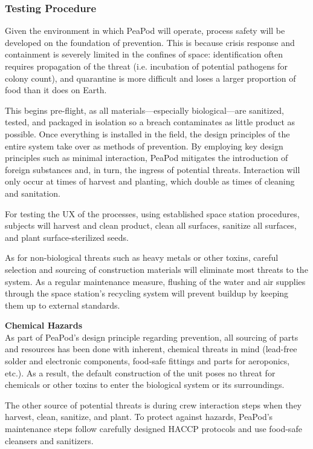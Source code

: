\subsubsection{Testing Procedure}

Given the environment in which PeaPod will operate, process safety will be developed on the foundation of prevention. This is because crisis response and containment is severely limited in the confines of space: identification often requires propagation of the threat (i.e. incubation of potential pathogens for colony count), and quarantine is more difficult and loses a larger proportion of food than it does on Earth.

This begins pre-flight, as all materials---especially biological---are sanitized, tested, and packaged in isolation so a breach contaminates as little product as possible. Once everything is installed in the field, the design principles of the entire system take over as methods of prevention. By employing key design principles such as minimal interaction, PeaPod mitigates the introduction of foreign substances and, in turn, the ingress of potential threats. Interaction will only occur at times of harvest and planting, which double as times of cleaning and sanitation. 

For testing the UX of the processes, using established space station procedures, subjects will harvest and clean product, clean all surfaces, sanitize all surfaces, and plant surface-sterilized seeds.

As for non-biological threats such as heavy metals or other toxins, careful selection and sourcing of construction materials will eliminate most threats to the system. As a regular maintenance measure, flushing of the water and air supplies through the space station's recycling system will prevent buildup by keeping them up to external standards.

\textbf{Chemical Hazards}\\
As part of PeaPod's design principle regarding prevention, all sourcing of parts and resources has been done with inherent, chemical threats in mind (lead-free solder and electronic components, food-safe fittings and parts for aeroponics, etc.). As a result, the default construction of the unit poses no threat for chemicals or other toxins to enter the biological system or its surroundings.

The other source of potential threats is during crew interaction steps when they harvest, clean, sanitize, and plant. To protect against hazards, PeaPod's maintenance steps follow carefully designed HACCP protocols and use food-safe cleansers and sanitizers.

